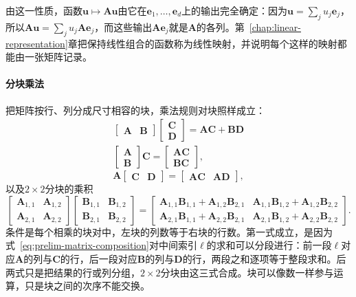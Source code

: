 由这一性质，函数$\bm u\mapsto\bm A\bm u$由它在$\bm e_1,\ldots,\bm e_d$上的输出完全确定：因为$\bm u=\sum_ju_j\bm e_j$，所以$\bm A\bm u=\sum_ju_j\bm A\bm e_j$，而这些输出$\bm A\bm e_j$就是$\bm A$的各列。第~\ref{chap:linear-representation}章把保持线性组合的函数称为线性映射，并说明每个这样的映射都能由一张矩阵记录。

\paragraph{分块乘法}
把矩阵按行、列分成尺寸相容的块，乘法规则对块照样成立：
\[
\begin{gathered}
\begin{bmatrix}\bm A&\bm B\end{bmatrix}\begin{bmatrix}\bm C\\\bm D\end{bmatrix}=\bm A\bm C+\bm B\bm D\\
\begin{bmatrix}\bm A\\\bm B\end{bmatrix}\bm C=\begin{bmatrix}\bm A\bm C\\\bm B\bm C\end{bmatrix},
\end{gathered}
\]
\[
 \bm A\begin{bmatrix}\bm C&\bm D\end{bmatrix}=\begin{bmatrix}\bm A\bm C&\bm A\bm D\end{bmatrix},
\]
以及$2\times2$分块的乘积
\[
 \begin{bmatrix}\bm A_{1,1}&\bm A_{1,2}\\\bm A_{2,1}&\bm A_{2,2}\end{bmatrix}
 \begin{bmatrix}\bm B_{1,1}&\bm B_{1,2}\\\bm B_{2,1}&\bm B_{2,2}\end{bmatrix}
 =\begin{bmatrix}
  \bm A_{1,1}\bm B_{1,1}+\bm A_{1,2}\bm B_{2,1}&\bm A_{1,1}\bm B_{1,2}+\bm A_{1,2}\bm B_{2,2}\\
  \bm A_{2,1}\bm B_{1,1}+\bm A_{2,2}\bm B_{2,1}&\bm A_{2,1}\bm B_{1,2}+\bm A_{2,2}\bm B_{2,2}
 \end{bmatrix}.
\]
条件是每个相乘的块对中，左块的列数等于右块的行数。第一式成立，是因为式~\eqref{eq:prelim-matrix-composition}对中间索引$\ell$的求和可以分段进行：前一段$\ell$对应$\bm A$的列与$\bm C$的行，后一段对应$\bm B$的列与$\bm D$的行，两段之和逐项等于整段求和。后两式只是把结果的行或列分组，$2\times2$分块由这三式合成。块可以像数一样参与运算，只是块之间的次序不能交换。

